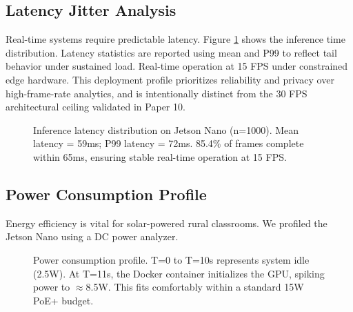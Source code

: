 \documentclass[conference]{IEEEtran}
\begin{document}
\subsection{Latency Jitter Analysis}
Real-time systems require predictable latency. Figure \ref{fig:jitter} shows the inference time distribution. Latency statistics are reported using mean and P99 to reflect tail behavior under sustained load. Real-time operation at 15 FPS under constrained edge hardware. This deployment profile prioritizes reliability and privacy over high-frame-rate analytics, and is intentionally distinct from the 30 FPS architectural ceiling validated in Paper 10.

\begin{figure}[htbp]
\centering
{}
\caption{Inference latency distribution on Jetson Nano (n=1000). Mean latency = 59ms; P99 latency = 72ms. 85.4\% of frames complete within 65ms, ensuring stable real-time operation at 15 FPS.}
\label{fig:jitter}
\end{figure}

\subsection{Power Consumption Profile}
Energy efficiency is vital for solar-powered rural classrooms. We profiled the Jetson Nano using a DC power analyzer.

\begin{figure}[htbp]
\centering
{}
\caption{Power consumption profile. T=0 to T=10s represents system idle (2.5W). At T=11s, the Docker container initializes the GPU, spiking power to $\approx$8.5W. This fits comfortably within a standard 15W PoE+ budget.}
\label{fig:power}
\end{figure}
\end{document}
